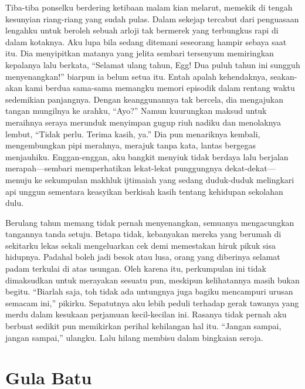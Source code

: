 \documentclass[smalldemyvopaper,11pt,twoside,onecolumn,openright,extrafontsizes]{memoir}
\begin{document}
Tiba-tiba ponselku berdering ketibaan malam kian melarut, memekik di tengah kesunyian riang-riang yang sudah pulas. Dalam sekejap tercabut dari penguasaan lengahku untuk beroleh sebuah arloji tak bermerek yang terbungkus rapi di dalam kotaknya. Aku lupa bila sedang ditemani seseorang hampir sebaya saat itu. Dia menyipitkan matanya yang jelita sembari tersenyum memiringkan kepalanya lalu berkata, ``Selamat ulang tahun, Egg! Dua puluh tahun ini sungguh menyenangkan!'' biarpun ia belum setua itu. Entah apalah kehendaknya, seakan-akan kami berdua sama-sama memangku memori episodik dalam rentang waktu sedemikian panjangnya. Dengan keanggunannya tak bercela, dia mengajukan tangan mungilnya ke arahku, ``Ayo?'' Namun kuurungkan maksud untuk meraihnya seraya merunduk menyimpan gugup riuh nadiku dan menolaknya lembut, ``Tidak perlu. Terima kasih, ya.'' Dia pun menariknya kembali, mengembungkan pipi merahnya, merajuk tanpa kata, lantas bergegas menjauhiku. Enggan-enggan, aku bangkit menyiuk tidak berdaya lalu berjalan merapah---sembari memperhatikan lekat-lekat punggungnya dekat-dekat---menuju ke sekumpulan makhluk ijtimaiah yang sedang duduk-duduk melingkari api unggun sementara keasyikan berkisah kasih tentang kehidupan sekolahan dulu.

Berulang tahun memang tidak pernah menyenangkan, semuanya mengacungkan tangannya tanda setuju. Betapa tidak, kebanyakan mereka yang berumah di sekitarku lekas sekali mengeluarkan cek demi memestakan hiruk pikuk sisa hidupnya. Padahal boleh jadi besok atau lusa, orang yang diberinya selamat padam terkulai di atas usungan. Oleh karena itu, perkumpulan ini tidak dimaksudkan untuk merayakan sesuatu pun, meskipun kelihatannya masih bukan begitu. ``Biarlah saja, toh tidak ada untungnya juga bagiku mencampuri urusan semacam ini,'' pikirku. Sepatutnya aku lebih peduli terhadap gerak tawanya yang merdu dalam kesukaan perjamuan kecil-kecilan ini. Rasanya tidak pernah aku berbuat sedikit pun memikirkan perihal kehilangan hal itu. ``Jangan sampai, jangan sampai,'' ulangku. Lalu hilang membisu dalam bingkaian seroja.

\chapter{Gula Batu}

\end{document}
